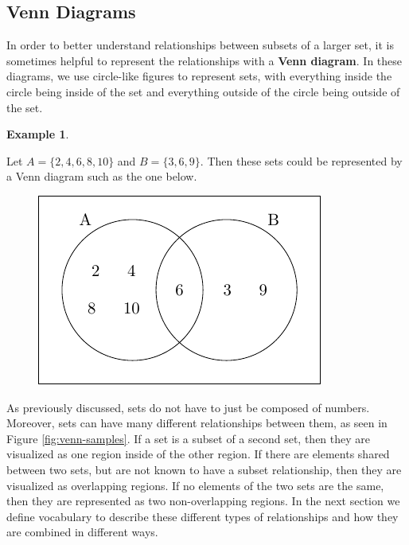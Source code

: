\documentclass[
]{book}
\theoremstyle{definition}
\theoremstyle{definition}
\newtheorem{example}{Example}[chapter]
\theoremstyle{definition}
\theoremstyle{definition}
\theoremstyle{remark}
\begin{document}
\hypertarget{venn-diagrams}{%
\subsection{Venn Diagrams}\label{venn-diagrams}}

In order to better understand relationships between subsets of a larger set, it is sometimes helpful to represent the relationships with a \textbf{Venn diagram}. In these diagrams, we use circle-like figures to represent sets, with everything inside the circle being inside of the set and everything outside of the circle being outside of the set.

\begin{example}
\protect\hypertarget{exm:unlabeled-div-6}{}\label{exm:unlabeled-div-6}

Let \(A=\{2, 4, 6, 8, 10\}\) and \(B=\{3, 6, 9\}\). Then these sets could be represented by a Venn diagram such as the one below.

\begin{figure}

{\centering \includegraphics[width=0.35\linewidth]{tikz/VennEx2-1-6} 

}

\end{figure}

\end{example}

As previously discussed, sets do not have to just be composed of numbers. Moreover, sets can have many different relationships between them, as seen in Figure \ref{fig:venn-samples}. If a set is a subset of a second set, then they are visualized as one region inside of the other region. If there are elements shared between two sets, but are not known to have a subset relationship, then they are visualized as overlapping regions. If no elements of the two sets are the same, then they are represented as two non-overlapping regions. In the next section we define vocabulary to describe these different types of relationships and how they are combined in different ways.
\end{document}
